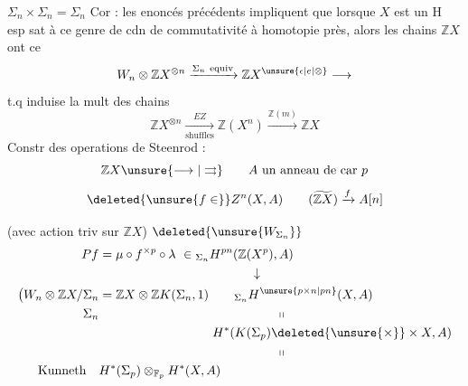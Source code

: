 
\(\Sigma_n\times\Sigma_n=\Sigma_n\)
Cor : les enoncés précédents impliquent que lorsque \(X\) est un H esp sat à ce genre de cdn de commutativité à homotopie près, alors les chains \(\mathbb ZX\) ont ce
\[
W_n\otimes\mathbb ZX^{\otimes n}\xrightarrow{\Sigma_n\ \text{equiv}}\mathbb ZX^{\unsure{\epsilon|e|\otimes}}\longrightarrow
\]
t.q induise la mult des chains
\[
\mathbb ZX^{\otimes n}\xrightarrow[\text{shuffles}]{EZ}\mathbb Z(X^n)\xrightarrow{\mathbb Z(m)}\mathbb ZX
\]
Constr des operations de Steenrod :
\[
\mathbb ZX\unsure{\longrightarrow|\rightrightarrows}\qquad A\ \text{un anneau de car}\ p
\]
\[
\deleted{\unsure{f\in}}Z^n(X,A)\qquad(\widetilde{\mathbb ZX})\xrightarrow{f} A[n]
\]

(avec action triv sur \(\mathbb ZX\))
\(\deleted{\unsure{W_{\Sigma_n}}}\)
\[
\begin{aligned}
Pf&=\mu\circ f^{\times p}\circ\lambda\ \in{}_{\Sigma_n}H^{pn}(\mathbb Z(X^p),A)\\
&\hspace{12em}\downarrow\\
\bigl(W_n\otimes\mathbb ZX/\Sigma_n&=\mathbb ZX\otimes\mathbb ZK(\Sigma_n,1)\qquad{}_{\Sigma_n}H^{\unsure{p\times n|pn}}(X,A)\\
\Sigma_n&\hspace{14em}\shortparallel\\
&\hspace{9em}H^*(K(\Sigma_{p})\deleted{\unsure{\times}}\times X,A)\\
&\hspace{14em}\shortparallel\\
\text{Kunneth}\quad &H^*(\Sigma_p)\otimes_{\mathbb F_p}H^*(X,A)
\end{aligned}
\]
